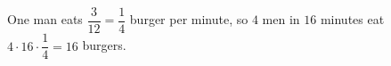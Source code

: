 One man eats $\dfrac{3}{12}=\dfrac14$ burger per minute, so $4$ men in $16$ minutes eat $4\cdot16\cdot\dfrac14=\boxed{16}$ burgers.

